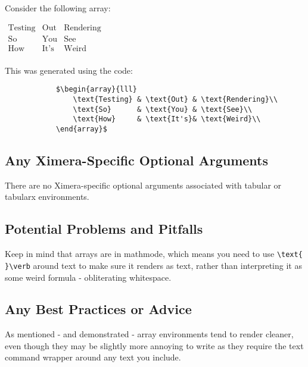 \documentclass{ximera}
\begin{document}
        Consider the following array:
        
        $\begin{array}{lll}
            \text{Testing} & \text{Out} & \text{Rendering}\\
            \text{So}      & \text{You} & \text{See}\\
            \text{How}     & \text{It's}& \text{Weird}\\
        \end{array}$
        
        This was generated using the code:
        
        \begin{verbatim}
            $\begin{array}{lll}
                \text{Testing} & \text{Out} & \text{Rendering}\\
                \text{So}      & \text{You} & \text{See}\\
                \text{How}     & \text{It's}& \text{Weird}\\
            \end{array}$
        \end{verbatim}
        
    \subsection*{Any Ximera-Specific Optional Arguments}
        There are no Ximera-specific optional arguments associated with tabular or tabularx environments.
        
        
    \subsection*{Potential Problems and Pitfalls}
        Keep in mind that arrays are in mathmode, which means you need to use \verb|\text{ }\verb| around text to make sure it renders as text, rather than interpreting it as some weird formula - obliterating whitespace.
        
        
    \subsection*{Any Best Practices or Advice}
        As mentioned - and demonstrated - array environments tend to render cleaner, even though they may be slightly more annoying to write as they require the text command wrapper around any text you include. 
        
        
\end{document}
